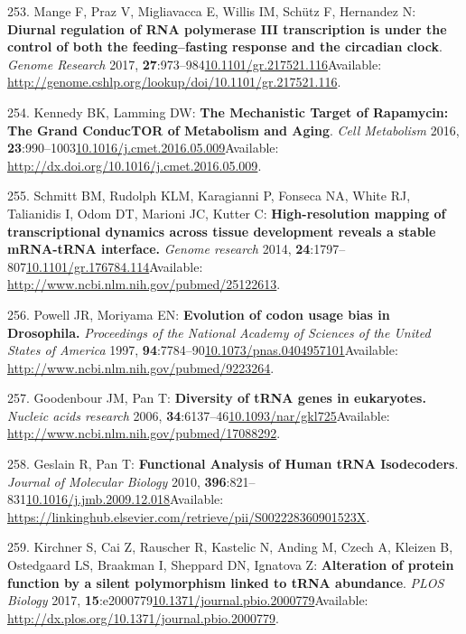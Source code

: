 \documentclass[
]{book}
\begin{document}
\leavevmode\hypertarget{ref-Mange2017}{}%
253. Mange F, Praz V, Migliavacca E, Willis IM, Schütz F, Hernandez N: \textbf{Diurnal regulation of RNA polymerase III transcription is under the control of both the feeding--fasting response and the circadian clock}. \emph{Genome Research} 2017, \textbf{27}:973--984\href{https://doi.org/10.1101/gr.217521.116}{10.1101/gr.217521.116}Available: \url{http://genome.cshlp.org/lookup/doi/10.1101/gr.217521.116}.

\leavevmode\hypertarget{ref-Kennedy2016}{}%
254. Kennedy BK, Lamming DW: \textbf{The Mechanistic Target of Rapamycin: The Grand ConducTOR of Metabolism and Aging}. \emph{Cell Metabolism} 2016, \textbf{23}:990--1003\href{https://doi.org/10.1016/j.cmet.2016.05.009}{10.1016/j.cmet.2016.05.009}Available: \url{http://dx.doi.org/10.1016/j.cmet.2016.05.009}.

\leavevmode\hypertarget{ref-Schmitt2014}{}%
255. Schmitt BM, Rudolph KLM, Karagianni P, Fonseca NA, White RJ, Talianidis I, Odom DT, Marioni JC, Kutter C: \textbf{High-resolution mapping of transcriptional dynamics across tissue development reveals a stable mRNA-tRNA interface.} \emph{Genome research} 2014, \textbf{24}:1797--807\href{https://doi.org/10.1101/gr.176784.114}{10.1101/gr.176784.114}Available: \url{http://www.ncbi.nlm.nih.gov/pubmed/25122613}.

\leavevmode\hypertarget{ref-Powell1997}{}%
256. Powell JR, Moriyama EN: \textbf{Evolution of codon usage bias in Drosophila.} \emph{Proceedings of the National Academy of Sciences of the United States of America} 1997, \textbf{94}:7784--90\href{https://doi.org/10.1073/pnas.0404957101}{10.1073/pnas.0404957101}Available: \url{http://www.ncbi.nlm.nih.gov/pubmed/9223264}.

\leavevmode\hypertarget{ref-Goodenbour2006}{}%
257. Goodenbour JM, Pan T: \textbf{Diversity of tRNA genes in eukaryotes.} \emph{Nucleic acids research} 2006, \textbf{34}:6137--46\href{https://doi.org/10.1093/nar/gkl725}{10.1093/nar/gkl725}Available: \url{http://www.ncbi.nlm.nih.gov/pubmed/17088292}.

\leavevmode\hypertarget{ref-Geslain2010}{}%
258. Geslain R, Pan T: \textbf{Functional Analysis of Human tRNA Isodecoders}. \emph{Journal of Molecular Biology} 2010, \textbf{396}:821--831\href{https://doi.org/10.1016/j.jmb.2009.12.018}{10.1016/j.jmb.2009.12.018}Available: \url{https://linkinghub.elsevier.com/retrieve/pii/S002228360901523X}.

\leavevmode\hypertarget{ref-Kirchner2017}{}%
259. Kirchner S, Cai Z, Rauscher R, Kastelic N, Anding M, Czech A, Kleizen B, Ostedgaard LS, Braakman I, Sheppard DN, Ignatova Z: \textbf{Alteration of protein function by a silent polymorphism linked to tRNA abundance}. \emph{PLOS Biology} 2017, \textbf{15}:e2000779\href{https://doi.org/10.1371/journal.pbio.2000779}{10.1371/journal.pbio.2000779}Available: \url{http://dx.plos.org/10.1371/journal.pbio.2000779}.
\end{document}
